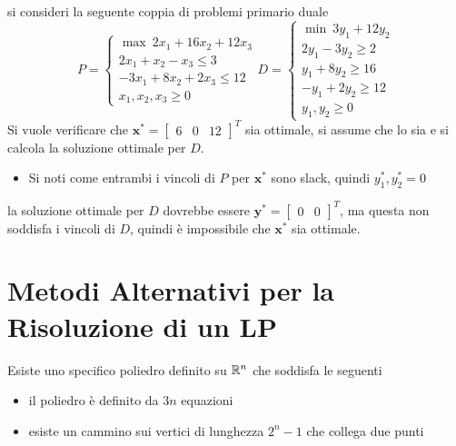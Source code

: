 \documentclass[10pt, letterpaper]{report}
\newcommand{\x}{{\mathbf{x}}}
\newcommand{\y}{{\mathbf{y}}}
\begin{document}
si consideri la seguente coppia di problemi primario duale\begin{equation}
    P=\begin{cases}
        \max \ 2x_1+16x_2+12x_3 \\ 
        2x_1+x_2-x_3\le 3\\ 
        -3x_1+8x_2+2x_3\le 12 \\ 
        x_1,x_2,x_3\ge 0
    \end{cases}
    D=\begin{cases}
        \min \ 3y_1+12y_2\\ 
        2y_1-3y_2\ge 2 \\ 
        y_1+8y_2\ge 16\\ 
        -y_1+2y_2\ge 12 \\ 
        y_1,y_2\ge 0
    \end{cases}
\end{equation}
Si vuole verificare che $\x^*=\begin{bmatrix}
    6&0&12
\end{bmatrix}^T$ sia ottimale, si assume che lo sia e si calcola la soluzione ottimale per $D$.\begin{itemize}
    \item Si noti come entrambi i vincoli di $P$ per $\x^*$ sono slack, quindi $y^*_1,y_2^*=0$
\end{itemize}
la soluzione ottimale per $D$ dovrebbe essere $\y^*=\begin{bmatrix}
    0&0
\end{bmatrix}^T$, ma questa non soddisfa i vincoli di $D$, quindi è impossibile che $\x^*$ sia ottimale.

\chapter{Metodi Alternativi per la Risoluzione di un LP}
Esiste uno specifico poliedro definito su ${\mathbb R}^n$ che soddisfa le seguenti \begin{itemize}
    \item il poliedro è definito da $3n$ equazioni 
    \item esiste un cammino sui vertici di lunghezza $2^n-1$ che collega due punti
\end{itemize}
\begin{figure}[h]
\end{figure}
\end{document}
